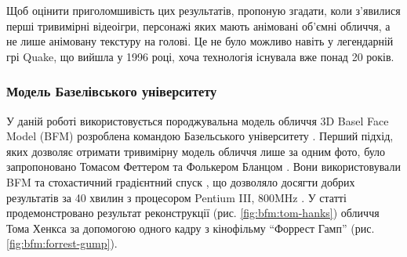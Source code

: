 Щоб оцінити приголомшивість цих результатів, пропоную згадати,
коли з'явилися перші тривимірні відеоігри,
персонажі яких мають анімовані об'ємні обличчя,
а не лише анімовану текстуру на голові.
Це не було можливо навіть у легендарній грі Quake,
що вийшла у 1996 році, хоча технологія існувала вже понад 20 років.

\subsubsection{Модель Базелівського університету}

У даній роботі використовується породжувальна модель обличчя
3D Basel Face Model (BFM)
розроблена командою Базельського університету
\cite{bfm09}.
Перший підхід,
яких дозволяє отримати тривимірну модель обличчя лише за одним фото,
було запропоновано Томасом Феттером та Фолькером Бланцом
\cite{blanz:vetter:1999}.
Вони використовували BFM та стохастичний градієнтний спуск \cite{sgd:1998},
що дозволяло досягти добрих результатів за 40 хвилин з процесором
Pentium III, 800MHz \cite{blanz:romdhani:vetter}.
У статті продемонстровано результат реконструкції (рис. \ref{fig:bfm:tom-hanks})
обличчя Тома Хенкса за допомогою одного кадру з кінофільму ``Форрест Гамп''
(рис. \ref{fig:bfm:forrest-gump}).

